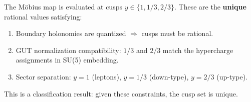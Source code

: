 \begin{tcolorbox}[colback=gray!5, colframe=gray!50, 
    title={\textbf{Why These Cusps?}}, fonttitle=\bfseries\small]
The M\"obius map is evaluated at cusps $y \in \{1, 1/3, 2/3\}$. These are the 
\textbf{unique} rational values satisfying:
\begin{enumerate}[leftmargin=1.5em, topsep=2pt, itemsep=1pt]
    \item Boundary holonomies are quantized $\Rightarrow$ cusps must be rational.
    \item GUT normalization compatibility: $1/3$ and $2/3$ match the hypercharge 
        assignments in SU(5) embedding.
    \item Sector separation: $y = 1$ (leptons), $y = 1/3$ (down-type), $y = 2/3$ (up-type).
\end{enumerate}
This is a classification result: given these constraints, the cusp set is unique.
\end{tcolorbox}

